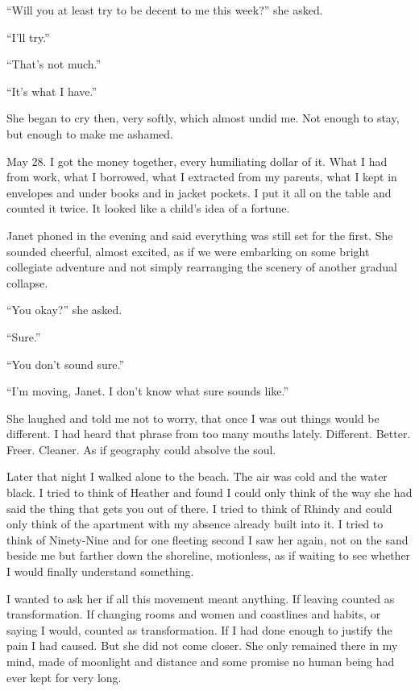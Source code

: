 ``Will you at least try to be decent to me this week?'' she asked.

``I'll try.''

``That's not much.''

``It's what I have.''

She began to cry then, very softly, which almost undid me. Not enough to
stay, but enough to make me ashamed.

May 28. I got the money together, every humiliating dollar of it. What I
had from work, what I borrowed, what I extracted from my parents, what I
kept in envelopes and under books and in jacket pockets. I put it all on
the table and counted it twice. It looked like a child's idea of a
fortune.

Janet phoned in the evening and said everything was still set for the
first. She sounded cheerful, almost excited, as if we were embarking on
some bright collegiate adventure and not simply rearranging the scenery
of another gradual collapse.

``You okay?'' she asked.

``Sure.''

``You don't sound sure.''

``I'm moving, Janet. I don't know what sure sounds like.''

She laughed and told me not to worry, that once I was out things would
be different. I had heard that phrase from too many mouths lately.
Different. Better. Freer. Cleaner. As if geography could absolve the
soul.

Later that night I walked alone to the beach. The air was cold and the
water black. I tried to think of Heather and found I could only think of
the way she had said the thing that gets you out of there. I tried to
think of Rhindy and could only think of the apartment with my absence
already built into it. I tried to think of Ninety-Nine and for one
fleeting second I saw her again, not on the sand beside me but farther
down the shoreline, motionless, as if waiting to see whether I would
finally understand something.

I wanted to ask her if all this movement meant anything. If leaving
counted as transformation. If changing rooms and women and coastlines
and habits, or saying I would, counted as transformation. If I had done
enough to justify the pain I had caused. But she did not come closer.
She only remained there in my mind, made of moonlight and distance and
some promise no human being had ever kept for very long.


